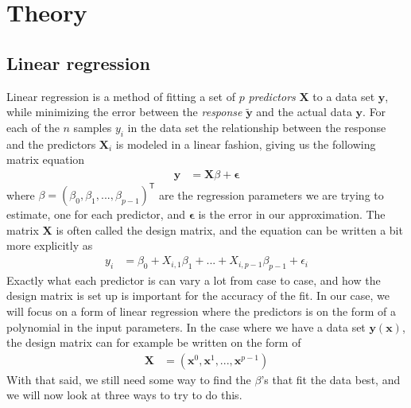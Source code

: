 \documentclass[a4paper]{article}
\newcommand{\XX}{\mathbf{X}}
\newcommand{\T}{\mathsf{T}}
\begin{document}
\section{Theory} \label{chap:theory}
\subsection{Linear regression} \label{sec:linreg}
Linear regression is a method of fitting a set of $p$ \textit{predictors} $\bm{X}$ to a data set $\bm{y}$, while minimizing the error between the \textit{response} $\bm{\tilde y}$ and the actual data $\bm{y}$. For each of the $n$ samples $y_i$ in the data set the relationship between the response and the predictors $\bm{X}_i$ is modeled in a linear fashion, giving us the following matrix equation
\begin{align*}
	\mathbf{y} &= \XX\beta + \bm{\epsilon}
\end{align*}
where $\beta = (\beta_0, \beta_1, ..., \beta_ {p-1})^\T$ are the regression parameters we are trying to estimate, one for each predictor, and $\bm{\epsilon}$ is the error in our approximation. The matrix $\XX$ is often called the design matrix, and the equation can be written a bit more explicitly as
\begin{align*}
	y_i &= \beta_0 + X_{i,1}\beta_1 + ... + X_{i,p-1}\beta_{p-1} + \epsilon_i
\end{align*}
Exactly what each predictor is can vary a lot from case to case, and how the design matrix is set up is important for the accuracy of the fit. In our case, we will focus on a form of linear regression where the predictors is on the form of a polynomial in the input parameters. In the case where we have a data set $\bm{y}(\bm{x})$, the design matrix can for example be written on the form of
\begin{align*}
	\XX &= (\bm{x}^0, \bm{x}^1, ... , \bm{x}^{p-1})
\end{align*} 
With that said, we still need some way to find the $\beta$'s that fit the data best, and we will now look at three ways to try to do this.
\end{document}
